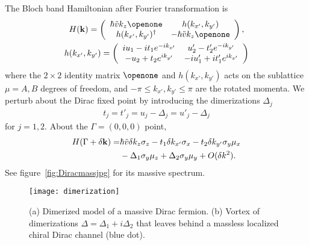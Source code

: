 The Bloch band Hamiltonian after Fourier transformation is \begin{gather}H({\bf k})=\left(\begin{array}{*{20}c}\hbar\tilde{v}k_z\openone&h(k_{x'},k_{y'})\\h(k_{x'},k_{y'})^\dagger&-\hbar\tilde{v}k_z\openone\end{array}\right),\label{DiracBloch}\\h(k_{x'},k_{y'})=\left(\begin{array}{*{20}c}iu_1-it_1e^{-ik_{x'}}&u'_2-t'_2e^{-ik_{y'}}\\-u_2+t_2e^{ik_{y'}}&-iu'_1+it'_1e^{ik_{x'}}\end{array}\right)\nonumber\end{gather} where the $2\times2$ identity matrix $\openone$ and $h(k_{x'},k_{y'})$ acts on the sublattice $\mu=A,B$ degrees of freedom, and $-\pi\leq k_{x'},k_{y'}\leq\pi$ are the rotated momenta. We perturb about the Dirac fixed point by introducing the dimerizations $\Delta_j$ \begin{align}t_j=t'_j=u_j-\Delta_j=u'_j-\Delta_j\end{align} for $j=1,2$. About the $\Gamma=(0,0,0)$ point, \begin{align}H(\Gamma+\delta{\bf k})=&\hbar\tilde{v}\delta k_z\sigma_z-t_1\delta k_{x'}\sigma_x-t_2\delta k_{y'}\sigma_y\mu_x\nonumber\\&-\Delta_1\sigma_y\mu_z+\Delta_2\sigma_y\mu_y+O(\delta k^2).\label{DiracHamwire}\end{align} See figure~\ref{fig:Diracmassjpg} for its massive spectrum.

\begin{figure}[htbp]
\centering\texttt{[image: dimerization]}
\caption{(a) Dimerized model of a massive Dirac fermion. (b) Vortex of dimerizations $\Delta=\Delta_1+i\Delta_2$ that leaves behind a massless localized chiral Dirac channel (blue dot).}\label{fig:dimerization}
\end{figure}

